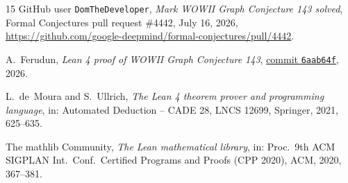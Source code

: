 \documentclass[11pt]{article}
\numberwithin{equation}{section}
\theoremstyle{remark}
\begin{document}
\begin{thebibliography}{15}
GitHub user \texttt{DomTheDeveloper},
\emph{Mark WOWII Graph Conjecture 143 solved},
Formal Conjectures pull request \#4442, July 16, 2026,
\url{https://github.com/google-deepmind/formal-conjectures/pull/4442}.

A.~Ferudun,
\emph{Lean 4 proof of WOWII Graph Conjecture 143},
\href{https://github.com/AlperTheKing/formal-conjectures/commit/6aab64fe70c1309463435260d104863dcef93807}{commit \texttt{6aab64f}}, 2026.


L.~de~Moura and S.~Ullrich,
\emph{The Lean 4 theorem prover and programming language},
in: Automated Deduction -- CADE 28, LNCS 12699, Springer, 2021, 625--635.

The mathlib Community,
\emph{The Lean mathematical library},
in: Proc.\ 9th ACM SIGPLAN Int.\ Conf.\ Certified Programs and Proofs
(CPP 2020), ACM, 2020, 367--381.

\end{thebibliography}
\end{document}
